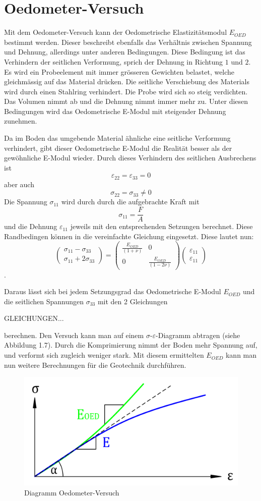 \section{Oedometer-Versuch\label{spannung:section:Oedometer-Versuch}}
Mit dem Oedometer-Versuch kann der Oedometrische Elastizitätsmodul $E_{OED}$ bestimmt werden.
Dieser beschreibt ebenfalls das Verhältnis zwischen Spannung und Dehnung, allerdings unter anderen Bedingungen.
Diese Bedingung ist das Verhindern der seitlichen Verformung, sprich der Dehnung in Richtung $1$ und $2$.
Es wird ein Probeelement mit immer grösseren Gewichten belastet, welche gleichmässig auf das Material drücken.
Die seitliche Verschiebung des Materials wird durch einen Stahlring verhindert.
Die Probe wird sich so steig verdichten.
Das Volumen nimmt ab und die Dehnung nimmt immer mehr zu.
Unter diesen Bedingungen wird das Oedometrische E-Modul mit steigender Dehnung zunehmen.

Da im Boden das umgebende Material ähnliche eine seitliche Verformung verhindert,
gibt dieser Oedometrische E-Modul die Realität besser als der gewöhnliche E-Modul wieder.
Durch dieses Verhindern des seitlichen Ausbrechens ist
\[
\varepsilon_{22}
=
\varepsilon_{33}
=
0
\]
aber auch
\[
\sigma_{22}
=
\sigma_{33}
\neq 0
\]
Die Spannung $\sigma_{11}$ wird durch durch die aufgebrachte Kraft mit
\[
\sigma_{11}
=
\frac{F}{A}
\]
und die Dehnung $\varepsilon_{11}$ jeweils mit den entsprechenden Setzungen berechnet.
Diese Randbedingen können in die vereinfachte Gleichung eingesetzt.
Diese lautet nun:
\[
\begin{pmatrix}
	\sigma_{11}-\sigma_{33} \\
	\sigma_{11}+2\sigma_{33}
\end{pmatrix}
=
\begin{pmatrix}
	\frac{E_{OED}}{(1+\nu)} &                        0 \\
                          0 & \frac{E_{OED}}{(1-2\nu)}
\end{pmatrix}
\begin{pmatrix}
	\varepsilon_{11}\\
	\varepsilon_{11}
\end{pmatrix}
\]
.

Daraus lässt sich bei jedem Setzungsgrad das Oedometrische E-Modul $E_{OED}$ und die seitlichen Spannungen $\sigma_{33}$ mit den 2 Gleichungen

GLEICHUNGEN...

berechnen.
Den Versuch kann man auf einem $\sigma$-$\varepsilon$-Diagramm abtragen (siehe Abbildung 1.7).
Durch die Komprimierung nimmt der Boden mehr Spannung auf, und verformt sich zugleich weniger stark.
Mit diesem ermittelten $E_{OED}$ kann man nun weitere Berechnungen für die Geotechnik durchführen.

\begin{figure}
	\centering
	\includegraphics[width=0.5\linewidth,keepaspectratio]{papers/spannung/Grafiken/DiagrammOedometer-Versuch.png}
	\caption{Diagramm Oedometer-Versuch}
	\label{fig:Diagramm Oedometer-Versuch}
\end{figure}